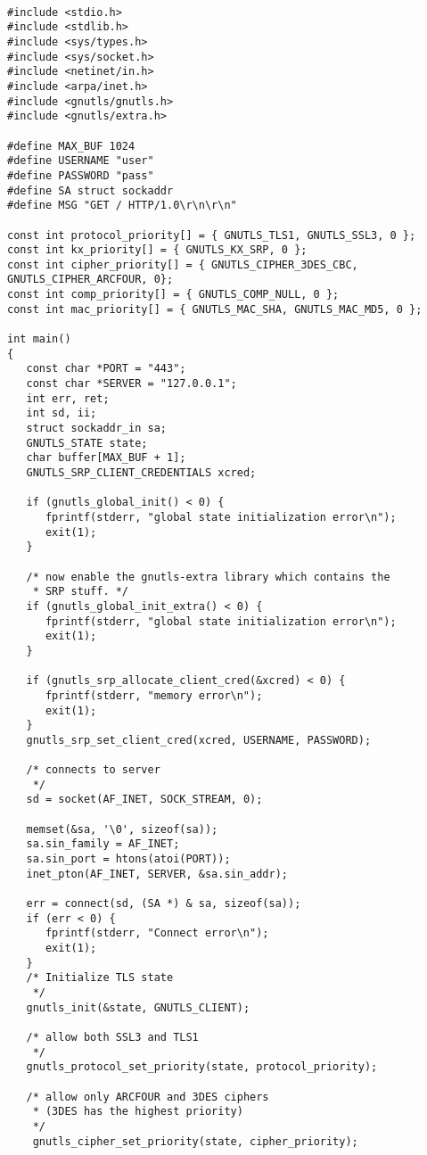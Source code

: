 \begin{verbatim}

#include <stdio.h>
#include <stdlib.h>
#include <sys/types.h>
#include <sys/socket.h>
#include <netinet/in.h>
#include <arpa/inet.h>
#include <gnutls/gnutls.h>
#include <gnutls/extra.h>

#define MAX_BUF 1024
#define USERNAME "user"
#define PASSWORD "pass"
#define SA struct sockaddr
#define MSG "GET / HTTP/1.0\r\n\r\n"

const int protocol_priority[] = { GNUTLS_TLS1, GNUTLS_SSL3, 0 };
const int kx_priority[] = { GNUTLS_KX_SRP, 0 };
const int cipher_priority[] = { GNUTLS_CIPHER_3DES_CBC, GNUTLS_CIPHER_ARCFOUR, 0};
const int comp_priority[] = { GNUTLS_COMP_NULL, 0 };
const int mac_priority[] = { GNUTLS_MAC_SHA, GNUTLS_MAC_MD5, 0 };

int main()
{
   const char *PORT = "443";
   const char *SERVER = "127.0.0.1";
   int err, ret;
   int sd, ii;
   struct sockaddr_in sa;
   GNUTLS_STATE state;
   char buffer[MAX_BUF + 1];
   GNUTLS_SRP_CLIENT_CREDENTIALS xcred;

   if (gnutls_global_init() < 0) {
      fprintf(stderr, "global state initialization error\n");
      exit(1);
   }

   /* now enable the gnutls-extra library which contains the
    * SRP stuff. */
   if (gnutls_global_init_extra() < 0) {
      fprintf(stderr, "global state initialization error\n");
      exit(1);
   }

   if (gnutls_srp_allocate_client_cred(&xcred) < 0) {
      fprintf(stderr, "memory error\n");
      exit(1);
   }
   gnutls_srp_set_client_cred(xcred, USERNAME, PASSWORD);

   /* connects to server 
    */
   sd = socket(AF_INET, SOCK_STREAM, 0);

   memset(&sa, '\0', sizeof(sa));
   sa.sin_family = AF_INET;
   sa.sin_port = htons(atoi(PORT));
   inet_pton(AF_INET, SERVER, &sa.sin_addr);

   err = connect(sd, (SA *) & sa, sizeof(sa));
   if (err < 0) {
      fprintf(stderr, "Connect error\n");
      exit(1);
   }
   /* Initialize TLS state 
    */
   gnutls_init(&state, GNUTLS_CLIENT);

   /* allow both SSL3 and TLS1
    */
   gnutls_protocol_set_priority(state, protocol_priority);
 
   /* allow only ARCFOUR and 3DES ciphers
    * (3DES has the highest priority)
    */
    gnutls_cipher_set_priority(state, cipher_priority);


\end{verbatim}
